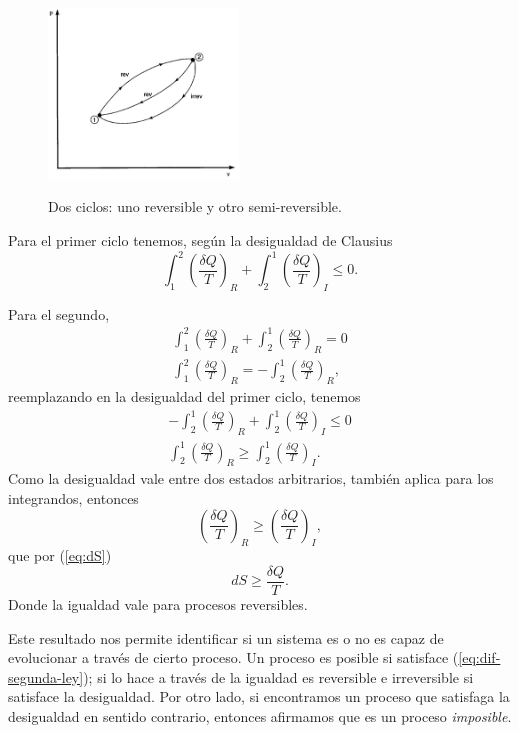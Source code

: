 \documentclass[openany]{book}
\begin{document}
\begin{figure}[htb!]
	\centering
	\includegraphics[width=0.45\textwidth]{img/entropia.png}
	\label{fig:ciclos-entropia}
	\caption{Dos ciclos: uno reversible y otro semi-reversible.}
\end{figure}

\par Para el primer ciclo tenemos, según la desigualdad de Clausius
\begin{equation*}
	\displaystyle\int_{1}^{2}\left(\frac{\delta Q}{T}\right)_R+\displaystyle\int_{2}^{1}\left(\frac{\delta Q}{T}\right)_I\leq0.
\end{equation*}
\par Para el segundo,
\begin{gather*}
	\displaystyle\int_{1}^{2}\left(\frac{\delta Q}{T}\right)_R+\displaystyle\int_{2}^{1}\left(\frac{\delta Q}{T}\right)_R=0\\
	\displaystyle\int_{1}^{2}\left(\frac{\delta Q}{T}\right)_R=-\displaystyle\int_{2}^{1}\left(\frac{\delta Q}{T}\right)_R,
\end{gather*}
reemplazando en la desigualdad del primer ciclo, tenemos
\begin{gather*}
	-\displaystyle\int_{2}^{1}\left(\frac{\delta Q}{T}\right)_R+\displaystyle\int_{2}^{1}\left(\frac{\delta Q}{T}\right)_I\leq0\\
	\displaystyle\int_{2}^{1}\left(\frac{\delta Q}{T}\right)_R\geq\displaystyle\int_{2}^{1}\left(\frac{\delta Q}{T}\right)_I.
\end{gather*}
Como la desigualdad vale entre dos estados arbitrarios, también aplica para los integrandos, entonces
\begin{equation*}
	\left(\frac{\delta Q}{T}\right)_R\geq\left(\frac{\delta Q}{T}\right)_I,
\end{equation*}
que por (\ref{eq:dS})
\begin{equation}\label{eq:dif-segunda-ley}
	dS\geq\frac{\delta Q}{T}.
\end{equation}
Donde la igualdad vale para procesos reversibles.
\vspace{2mm}
\par Este resultado nos permite identificar si un sistema es o no es capaz de evolucionar a través de cierto proceso. Un proceso es posible si satisface (\ref{eq:dif-segunda-ley}); si lo hace a través de la igualdad es reversible e irreversible si satisface la desigualdad. Por otro lado, si encontramos un proceso que satisfaga la desigualdad en sentido contrario, entonces afirmamos que es un proceso \emph{imposible}.
\end{document}
